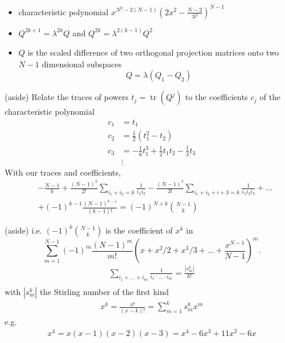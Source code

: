 \documentclass{beamer}
\DeclareMathOperator{\tr}{tr}
\newcommand{\I}{N}
\newcommand{\Q}{Q}
\newcommand{\eigval}{\lambda}
\newcommand{\speak}[1]{
  \iftoggle{speaktoggle}{
    {\tiny{\textcolor{red}{speak: #1}}\normalsize}
  }
  {}
}
\begin{document}
\begin{frame}
  \begin{itemize}
  \item characteristic polynomial  $x^{\I^2-2(\I-1)}(2x^2-\frac{\I-2}{\I^2})^{\I-1}$
  \item $\Q^{2k+1}=\eigval^{2k}\Q$ and $\Q^{2k}=\eigval^{2(k-1)}\Q^2$
  \item $\Q$ is the scaled difference of two orthogonal  projection matrices onto two $\I-1$ dimensional subspaces $$\Q = \lambda(\Q_1-\Q_2)$$
  \end{itemize}
\end{frame}
\begin{frame}
  (aside) Relate the traces of powers $t_j=\tr(\Q^j)$ to the coefficients $c_j$ of the characteristic polynomial
  \begin{align}
    c_1&=t_1\\
    c_2&=\frac{1}{2}(t_1^2-t_2)\\
    c_3&=-\frac{1}{6}t_1^3+\frac{1}{2}t_1t_2-\frac{1}{3}t_3\\
    &\vdots
  \end{align}
  With our traces and coefficients,
  \begin{align}
    &-\frac{\I-1}{k}+\frac{(\I-1)^2}{2!}\sum_{i_1+i_2=k}\frac{1}{i_1i_2} - \frac{(\I-1)^3}{3!}\sum_{i_1+i_2+i+3=k}\frac{1}{i_1i_2i_3}+\ldots\\
    &+(-1)^{k-1}\frac{(\I-1)^{k-1}}{(k-1)!} = (-1)^{\I+k}{\I-1\choose k}
  \end{align}
\end{frame}
\begin{frame}
  (aside)
i.e. $(-1)^k{\I-1\choose k}$ is the coefficient of $x^k$ in $$\sum_{m=1}^{\I-1}(-1)^m\frac{(\I-1)^m}{m!}(x+x^2/2+x^3/3+\ldots+\frac{x^{\I-1}}{\I-1})^m.$$ 
  \begin{align}
    \sum_{i_1+\ldots+i_m}\frac{1}{i_1\cdot\ldots\cdot i_m}=\frac{|s^k_m|}{k!}\\
  \end{align}
  with $|s^k_m|$ the Stirling number of the first kind
  \begin{align}
    x^{\underline{k}}=\frac{x!}{(x-k)!}=\sum_{m=1}^k s^k_m x^m
  \end{align}
  e.g.
  \begin{align}
    x^{\underline{4}}=x(x-1)(x-2)(x-3)=x^4-6x^3+11x^2-6x
  \end{align}
\end{frame}
\end{document}
